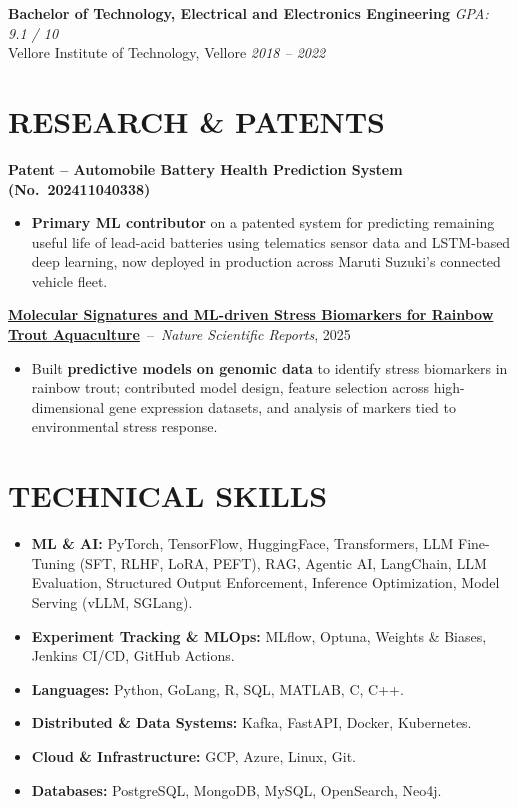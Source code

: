 \documentclass[9pt]{article}
\begin{document}
\textbf{Bachelor of Technology, Electrical and Electronics Engineering} \hfill \textit{GPA: 9.1 / 10}\\
Vellore Institute of Technology, Vellore \hfill \textit{2018 -- 2022}

\vspace{2pt}

\section*{RESEARCH \& PATENTS}

\textbf{Patent -- Automobile Battery Health Prediction System (No.~202411040338)}
\begin{itemize}
    \item \textbf{Primary ML contributor} on a patented system for predicting remaining useful life of lead-acid batteries using telematics sensor data and LSTM-based deep learning, now deployed in production across Maruti Suzuki's connected vehicle fleet.
\end{itemize}


\textbf{\href{https://www.nature.com/articles/s41598-025-30120-3}{Molecular Signatures and ML-driven Stress Biomarkers for Rainbow Trout Aquaculture}}~--~\textit{Nature Scientific Reports}, 2025
\begin{itemize}
    \item Built \textbf{predictive models on genomic data} to identify stress biomarkers in rainbow trout; contributed model design, feature selection across high-dimensional gene expression datasets, and analysis of markers tied to environmental stress response.
\end{itemize}

\section*{TECHNICAL SKILLS}
\begin{itemize}
    \item \textbf{ML \& AI:} PyTorch, TensorFlow, HuggingFace, Transformers, LLM Fine-Tuning (SFT, RLHF, LoRA, PEFT), RAG, Agentic AI, LangChain, LLM Evaluation, Structured Output Enforcement, Inference Optimization, Model Serving (vLLM, SGLang).
    \item \textbf{Experiment Tracking \& MLOps:} MLflow, Optuna, Weights \& Biases, Jenkins CI/CD, GitHub Actions.
    \item \textbf{Languages:} Python, GoLang, R, SQL, MATLAB, C, C++.
    \item \textbf{Distributed \& Data Systems:} Kafka, FastAPI,  Docker, Kubernetes.
    \item \textbf{Cloud \& Infrastructure:} GCP, Azure, Linux, Git.
    \item \textbf{Databases:} PostgreSQL, MongoDB, MySQL, OpenSearch, Neo4j.
\end{itemize}
\end{document}
